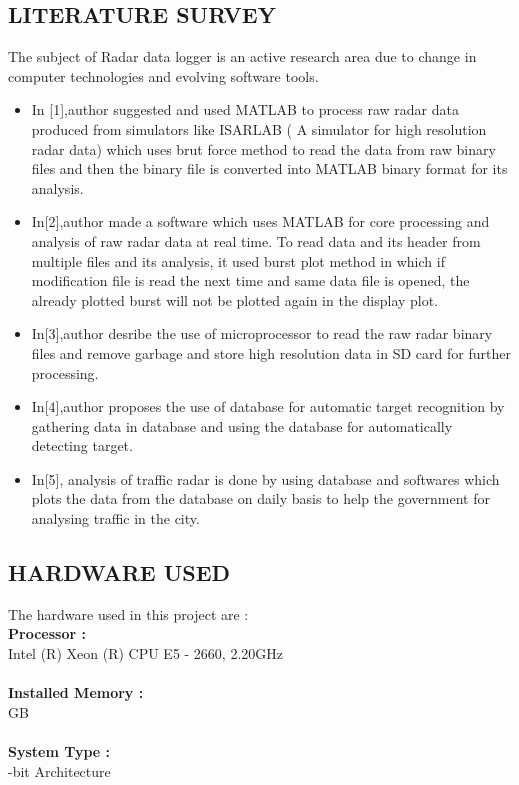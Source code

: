 \documentclass[14pt]{article} %
\begin{document}
 \subsection{LITERATURE SURVEY}
 The subject of Radar data logger is an active research area due to change in computer technologies and evolving software tools.
 \begin{itemize}
 \item In [1],author suggested and used MATLAB to process raw radar data produced from simulators like ISARLAB ( A simulator for high resolution radar data) which uses brut force method to read the data from raw binary files and then the binary file is converted into MATLAB binary format for its analysis.
 \item In[2],author made a software which uses MATLAB for core processing and analysis of raw radar data at real time. To read data and its header from multiple files and its analysis, it used burst plot method in which if modification file is read the next time and same data file is opened, the already plotted burst will not be plotted again in the display plot.
 \item In[3],author desribe the use of microprocessor to read the raw radar binary files and remove garbage and store high resolution data in SD card for further processing.
 \item In[4],author proposes the use of database for automatic target recognition by gathering data in database and using the database for automatically detecting target.
 \item In[5], analysis of traffic radar is done by using database and softwares which plots the data from the database on daily basis to help the government for analysing traffic in the city.
 \end{itemize}

\subsection{HARDWARE USED}
\noindent The hardware used in this project are :\\
\textbf{Processor : } \\
\indent Intel (R) Xeon (R) CPU E5 - 2660, 2.20GHz\\
\\ \textbf{Installed Memory : }\\
 GB\\
\\ \textbf{System Type : }\\
 -bit Architecture
 
\end{document}

